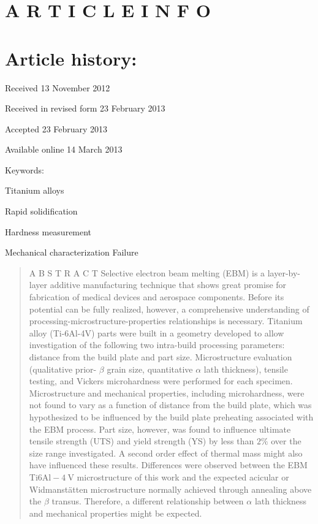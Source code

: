\documentclass[10pt]{article}
\begin{document}
\section*{A R T I C L E I N F O}
\section*{Article history:}
Received 13 November 2012

Received in revised form 23 February 2013

Accepted 23 February 2013

Available online 14 March 2013

Keywords:

Titanium alloys

Rapid solidification

Hardness measurement

Mechanical characterization Failure

\begin{abstract}
A B S T R A C T Selective electron beam melting (EBM) is a layer-by-layer additive manufacturing technique that shows great promise for fabrication of medical devices and aerospace components. Before its potential can be fully realized, however, a comprehensive understanding of processing-microstructure-properties relationships is necessary. Titanium alloy (Ti-6Al-4V) parts were built in a geometry developed to allow investigation of the following two intra-build processing parameters: distance from the build plate and part size. Microstructure evaluation (qualitative prior- $\beta$ grain size, quantitative $\alpha$ lath thickness), tensile testing, and Vickers microhardness were performed for each specimen. Microstructure and mechanical properties, including microhardness, were not found to vary as a function of distance from the build plate, which was hypothesized to be influenced by the build plate preheating associated with the EBM process. Part size, however, was found to influence ultimate tensile strength (UTS) and yield strength (YS) by less than $2 \%$ over the size range investigated. A second order effect of thermal mass might also have influenced these results. Differences were observed between the EBM Ti$6 \mathrm{Al}-4 \mathrm{~V}$ microstructure of this work and the expected acicular or Widmanstätten microstructure normally achieved through annealing above the $\beta$ transus. Therefore, a different relationship between $\alpha$ lath thickness and mechanical properties might be expected.
\end{abstract}
\end{document}
